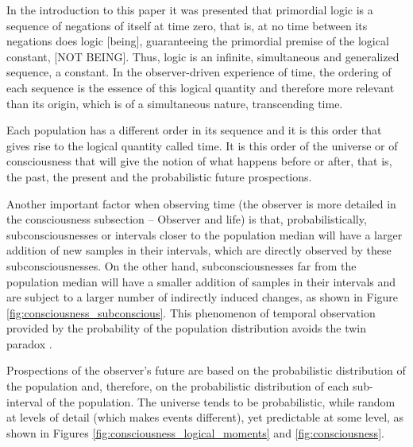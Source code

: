 In the introduction to this paper it was presented that primordial logic is a sequence of negations of itself at time zero, that is, at no time between its negations does logic [being], guaranteeing the primordial premise of the logical constant, [NOT BEING]. Thus, logic is an infinite, simultaneous and generalized sequence, a constant. In the observer-driven experience of time, the ordering of each sequence is the essence of this logical quantity and therefore more relevant than its origin, which is of a simultaneous nature, transcending time.

Each population has a different order in its sequence and it is this order that gives rise to the logical quantity called time. It is this order of the universe or of consciousness that will give the notion of what happens before or after, that is, the past, the present and the probabilistic future prospections.

Another important factor when observing time (the observer is more detailed in the consciousness subsection – Observer and life) is that, probabilistically, subconsciousnesses or intervals closer to the population median will have a larger addition of new samples in their intervals, which are directly observed by these subconsciousnesses. On the other hand, subconsciousnesses far from the population median will have a smaller addition of samples in their intervals and are subject to a larger number of indirectly induced changes, as shown in Figure \ref{fig:consciousness_subconscious}.  This phenomenon of temporal observation provided by the probability of the population distribution avoids the twin paradox \cite{twin_paradox}.

Prospections of the observer's future are based on the probabilistic distribution of the population and, therefore, on the probabilistic distribution of each sub-interval of the population. The universe tends to be probabilistic, while random at levels of detail (which makes events different), yet predictable at some level, as shown in Figures \ref{fig:consciousness_logical_moments} and \ref{fig:consciousness}. 

